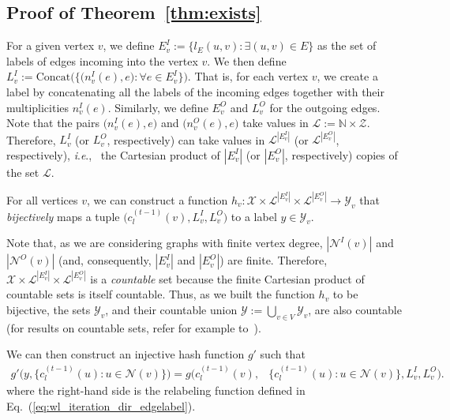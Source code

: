 \documentclass{article} \usepackage{iclr2019_conference,times}
\newcommand{\ie}{\textit{i}.\textit{e}., }
\begin{document}
\subsection{Proof of Theorem~\ref{thm:exists}} 

For a given vertex $v$, we define $E^I_v := \{ l_E(u,v):  \exists (u,v) \in E\}$ as the set of labels of edges incoming into the vertex $v$. We then define $L_v^I := \mathrm{Concat}\Big(\big\{ \big(n^I_v(e), e\big): \forall e \in E^I_v \big\}\Big)$. That is, for each vertex $v$, we create a label by concatenating all the labels of the incoming edges together with their multiplicities $n^I_v(e)$. Similarly, we define $E^O_v$ and $L_v^O$ for the outgoing edges. Note that the pairs $\big(n^I_v(e), e\big)$ and $\big(n^O_v(e), e\big)$ take values in $\mathcal{L} := \mathbb{N} \times \mathcal{Z}$. Therefore, $L_v^I$ (or $L_v^O$, respectively) can take values in $\mathcal{L}^{|E^I_v|}$ (or $\mathcal{L}^{|E^O_v|}$, respectively), \ie~the Cartesian product of $|E^I_v|$ (or $|E^O_v|$, respectively) copies of the set $\mathcal{L}$.

For all vertices $v$, we can construct a function $h_v: \mathcal{X} \times \mathcal{L}^{|E^I_v|} \times \mathcal{L}^{|E^O_v|} \rightarrow \mathcal{Y}_v$ that \emph{bijectively} maps a tuple $\Big(c_l^{(t-1)}(v),L^I_v,L^O_v\Big)$ to a label $y \in \mathcal{Y}_v$. 

Note that, as we are considering graphs with finite vertex degree, $|\mathcal{N}^I(v)|$ and $|\mathcal{N}^O(v)|$ (and, consequently, $|E^I_v|$ and $|E^O_v|$) are finite. Therefore, $\mathcal{X} \times \mathcal{L}^{|E^I_v|} \times \mathcal{L}^{|E^O_v|}$ is a \emph{countable} set because the finite Cartesian product of countable sets is itself countable. Thus, as we built the function $h_v$ to be bijective, the sets $\mathcal{Y}_v$, and their countable union $\mathcal{Y} := \bigcup_{v \in V} \mathcal{Y}_v$, are also countable (for results on countable sets, refer for example to~\cite{Patterson1967}).

We can then construct an injective hash function $g'$ such that 
\begin{equation}\label{eq:reformulate_wl}
\begin{split}
    g'\Big(y, \big\{ c_l^{(t-1)}(u): u \in \mathcal{N}(v) \big\}\Big)
    = g\Big(c_l^{(t-1)}(v), &\big\{ c_l^{(t-1)}(u): u \in \mathcal{N}(v) \big\},L^I_v,L^O_v\Big).
\end{split}
\end{equation}
where the right-hand side is the relabeling function defined in Eq.~(\ref{eq:wl_iteration_dir_edgelabel}). 
\end{document}
